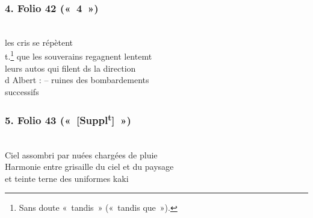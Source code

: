 \subsubsection*{4. Folio 42 («~4~»)}

\begin{LJlettre}
\noindent\hfill{}\\
les cris se répètent\\
t.\footnote{Sans doute «~tandis~» («~tandis que~»).} que les souverains regagnent lentemt\\
leurs autos qui filent ds la direction\\
d Albert : -- ruines des bombardements\\
successifs
\end{LJlettre}

\subsubsection*{5. Folio 43 («~[Suppl\textsuperscript{t}]~»)}

\begin{LJlettre}
\noindent\hfill{}\\
Ciel assombri par nuées chargées de pluie\\
Harmonie entre grisaille du ciel et du paysage\\
et teinte terne des uniformes kaki
\end{LJlettre}
\FloatBarrier
